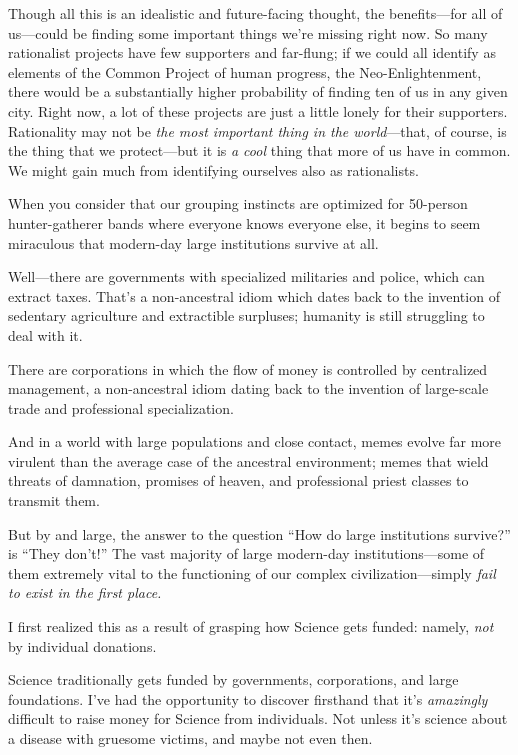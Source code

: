 {
 Though all this is an idealistic and future-facing thought, the
benefits---for all of us---could be finding some important things
we're missing right now. So many rationalist projects
have few supporters and far-flung; if we could all identify as elements
of the Common Project of human progress, the Neo-Enlightenment, there
would be a substantially higher probability of finding ten of us in any
given city. Right now, a lot of these projects are just a little lonely
for their supporters. Rationality may not be \textit{the most important
thing in the world}{}---that, of course, is the thing that we
protect---but it is \textit{a cool} thing that more of us have in
common. We might gain much from identifying ourselves also as
rationalists.}

\myendsectiontext


{
 When you consider that our grouping instincts are optimized for
50-person hunter-gatherer bands where everyone knows everyone else, it
begins to seem miraculous that modern-day large institutions survive at
all. }

{
 Well---there are governments with specialized militaries and
police, which can extract taxes. That's a non-ancestral
idiom which dates back to the invention of sedentary agriculture and
extractible surpluses; humanity is still struggling to deal with it.}

{
 There are corporations in which the flow of money is controlled by
centralized management, a non-ancestral idiom dating back to the
invention of large-scale trade and professional specialization.}

{
 And in a world with large populations and close contact, memes
evolve far more virulent than the average case of the ancestral
environment; memes that wield threats of damnation, promises of heaven,
and professional priest classes to transmit them.}

{
 But by and large, the answer to the question
``How do large institutions
survive?'' is ``They
don't!'' The vast majority of large
modern-day institutions---some of them extremely vital to the
functioning of our complex civilization---simply \textit{fail to exist
in the first place.}}

{
 I first realized this as a result of grasping how Science gets
funded: namely, \textit{not} by individual donations.}

{
 Science traditionally gets funded by governments, corporations,
and large foundations. I've had the opportunity to
discover firsthand that it's \textit{amazingly}
difficult to raise money for Science from individuals. Not unless
it's science about a disease with gruesome victims, and
maybe not even then.}

